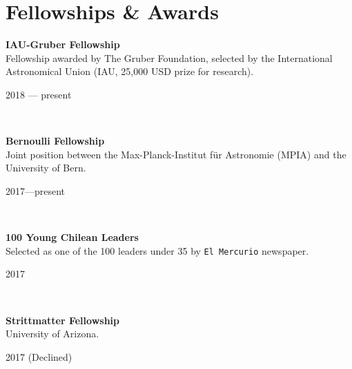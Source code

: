\documentclass[12pt, a4paper]{article} %
\begin{document}
\section*{Fellowships \& Awards}

\begin{minipage}[t]{0.7\textwidth}
\begin{flushleft}%
  \setlength{\leftskip}{0.2cm}%
\textbf{IAU-Gruber Fellowship}\\
Fellowship awarded by The Gruber Foundation, selected by the International Astronomical Union (IAU, 25,000 USD prize for research).
\end{flushleft}
\end{minipage}
\begin{minipage}[t]{0.3\textwidth}
\hfill 2018 --- present
\end{minipage}\\

\begin{minipage}[t]{0.7\textwidth}
\begin{flushleft}%
  \setlength{\leftskip}{0.2cm}%
\textbf{Bernoulli Fellowship}\\
Joint position between the Max-Planck-Institut f\"ur Astronomie (MPIA) and the University of Bern.
\end{flushleft}
\end{minipage}
\begin{minipage}[t]{0.3\textwidth}
\hfill 2017---present
\end{minipage}\\

\begin{minipage}[t]{0.7\textwidth}
\begin{flushleft}%
  \setlength{\leftskip}{0.2cm}%
\textbf{100 Young Chilean Leaders}\\
Selected as one of the 100 leaders under 35 by \texttt{El Mercurio} newspaper.
\end{flushleft}
\end{minipage}
\begin{minipage}[t]{0.3\textwidth}
\hfill 2017
\end{minipage}\\

\begin{minipage}[t]{0.7\textwidth}
\begin{flushleft}%
  \setlength{\leftskip}{0.2cm}%
\textbf{Strittmatter Fellowship}\\
University of Arizona.
\end{flushleft}
\end{minipage}
\begin{minipage}[t]{0.3\textwidth}
\hfill 2017 (Declined)
\end{minipage}\\
\end{document}
